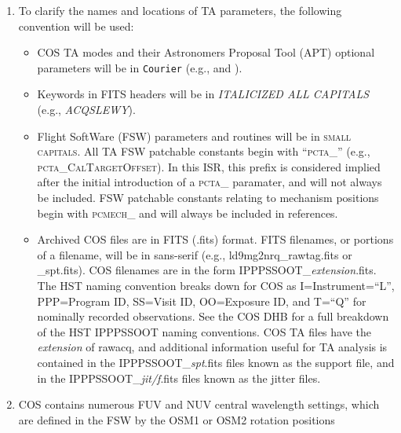 \begin{enumerate}
{		as these are how they are implemented in the HST ground commanding.}
	\item{To clarify the names and locations of TA parameters, the following convention will be used:
		\begin{itemize}
			\item{COS TA modes and their Astronomers Proposal Tool (APT) optional parameters will be in \texttt{Courier} (e.g.,  and \numpos).}
			\item{Keywords in FITS headers will be in \textit{ITALICIZED ALL CAPITALS} (e.g., \textit{ACQSLEWY}).}
			\item{Flight SoftWare (FSW) parameters and routines will be in \textsc{small capitals}.
			All TA FSW patchable constants begin with ``\textsc{pcta\_}'' (e.g., \textsc{pcta\_CalTargetOffset}).
			In this ISR, this prefix is considered implied after the initial introduction of a \textsc{pcta\_} paramater, and will not always be included.
			FSW patchable constants relating to mechanism positions begin with \textsc{pcmech\_} and will always be included in references.}
			\item{Archived COS files are in FITS (.fits) format. FITS filenames, or portions of a filename, will be in {\sf sans-serif} (e.g., {\sf ld9mg2nrq\_rawtag.fits} or {\sf \_spt.fits}).
			COS filenames are in the form {\sf IPPPSSOOT\_{\it extension}.fits}.
			The HST naming convention breaks down for COS as I=Instrument=``L'', PPP=Program ID, SS=Visit ID, OO=Exposure ID,
			and T=``Q'' for nominally recorded observations. See the COS DHB for a full breakdown of the HST IPPPSSOOT naming conventions.
			COS TA files have the {\it extension} of {\sf rawacq}, and additional
			information useful for TA analysis is contained in the {\sf IPPPSSOOT\_{\it spt}.fits} files known as the support file,
			and in the {\sf IPPPSSOOT\_{\it jit/f}.fits} files known as the jitter files.}
		\end{itemize}
	}
	\item{COS contains numerous FUV and NUV central wavelength settings, which are defined in the FSW by the OSM1 or OSM2 rotation positions
}
\end{enumerate}
